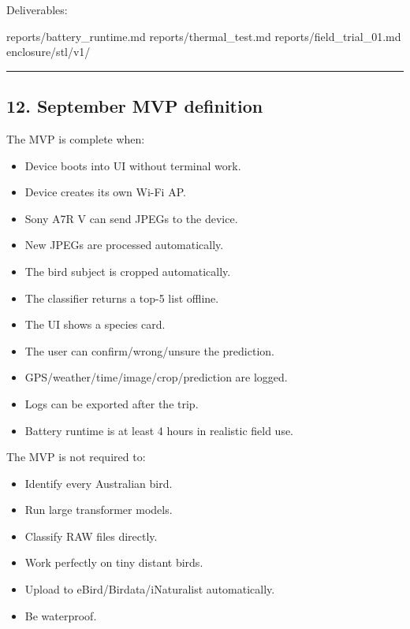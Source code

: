 \documentclass[
  11pt,
]{article}
\newenvironment{Shaded}{}{}
\newcommand{\NormalTok}[1]{#1}
\providecommand{\tightlist}{%
  \setlength{\itemsep}{0pt}\setlength{\parskip}{0pt}}
\begin{document}
Deliverables:

\begin{Shaded}
\begin{Highlighting}[]
\NormalTok{reports/battery\_runtime.md}
\NormalTok{reports/thermal\_test.md}
\NormalTok{reports/field\_trial\_01.md}
\NormalTok{enclosure/stl/v1/}
\end{Highlighting}
\end{Shaded}

\begin{center}\rule{0.5\linewidth}{0.5pt}\end{center}

\subsection{12. September MVP
definition}\label{september-mvp-definition}

The MVP is complete when:

\begin{itemize}
\tightlist
\item[$\square$]
  Device boots into UI without terminal work.
\item[$\square$]
  Device creates its own Wi-Fi AP.
\item[$\square$]
  Sony A7R V can send JPEGs to the device.
\item[$\square$]
  New JPEGs are processed automatically.
\item[$\square$]
  The bird subject is cropped automatically.
\item[$\square$]
  The classifier returns a top-5 list offline.
\item[$\square$]
  The UI shows a species card.
\item[$\square$]
  The user can confirm/wrong/unsure the prediction.
\item[$\square$]
  GPS/weather/time/image/crop/prediction are logged.
\item[$\square$]
  Logs can be exported after the trip.
\item[$\square$]
  Battery runtime is at least 4 hours in realistic field use.
\end{itemize}

The MVP is not required to:

\begin{itemize}
\tightlist
\item[$\square$]
  Identify every Australian bird.
\item[$\square$]
  Run large transformer models.
\item[$\square$]
  Classify RAW files directly.
\item[$\square$]
  Work perfectly on tiny distant birds.
\item[$\square$]
  Upload to eBird/Birdata/iNaturalist automatically.
\item[$\square$]
  Be waterproof.
\end{itemize}
\end{document}
